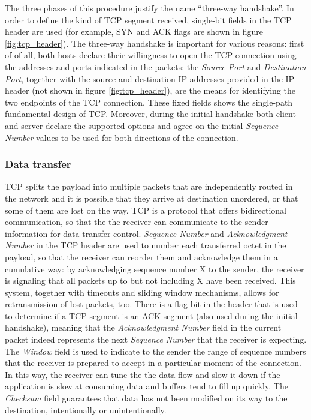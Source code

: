The three phases of this procedure justify the name ``three-way handshake''. In order to define the kind of TCP segment received, single-bit fields in the TCP header are used (for example, SYN and ACK flags are shown in figure \ref{fig:tcp_header}).
The three-way handshake is important for various reasons: first of of all, both hosts declare their willingness to open the TCP connection using the addresses and ports indicated in the packets: the \textit{Source Port} and \textit{Destination Port}, together with the source and destination IP addresses provided in the IP header (not shown in figure \ref{fig:tcp_header}), are the means for identifying the two endpoints of the TCP connection. These fixed fields shows the single-path fundamental design of TCP.
Moreover, during the initial handshake both client and server declare the supported options and agree on the initial \textit{Sequence Number} values to be used for both directions of the connection.

\subsubsection{Data transfer}
TCP splits the payload into multiple packets that are independently routed in the network and it is possible that they arrive at destination unordered, or that some of them are lost on the way. TCP is a protocol that offers bidirectional communication, so that the the receiver can communicate to the sender information for data transfer control. \textit{Sequence Number} and \textit{Acknowledgment Number} in the TCP header are used to number each transferred octet in the payload, so that the receiver can reorder them and acknowledge them in a cumulative way: by acknowledging sequence number X to the sender, the receiver is signaling that all packets up to but not including X have been received. This system, together with timeouts and sliding window mechanisms, allows for retransmission of lost packets, too. There is a flag bit in the header that is used to determine if a TCP segment is an ACK segment (also used during the initial handshake), meaning that the \textit{Acknowledgment Number} field in the current packet indeed represents the next \textit{Sequence Number} that the receiver is expecting.
The \textit{Window} field is used to indicate to the sender the range of sequence numbers that the receiver is prepared to accept in a particular moment of the connection. In this way, the receiver can tune the the data flow and slow it down if the application is slow at consuming data and buffers tend to fill up quickly. The \textit{Checksum} field guarantees that data has not been modified on its way to the destination, intentionally or unintentionally.

